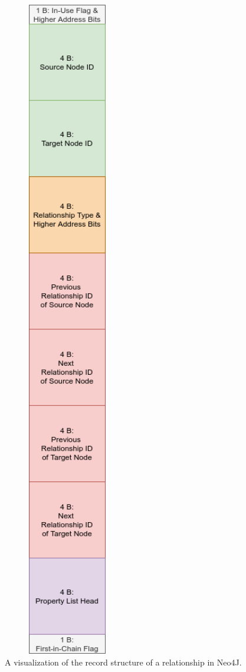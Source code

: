 \begin{figure}[htp]
\begin{center}
                    \includegraphics[keepaspectratio,height=0.9\textheight,width=0.5\textwidth]{img/03_record/relationship/relationship_record.png}
                \end{center}
                \caption{A visualization of the record structure of a relationship in Neo4J.} %
            \end{figure}
            
